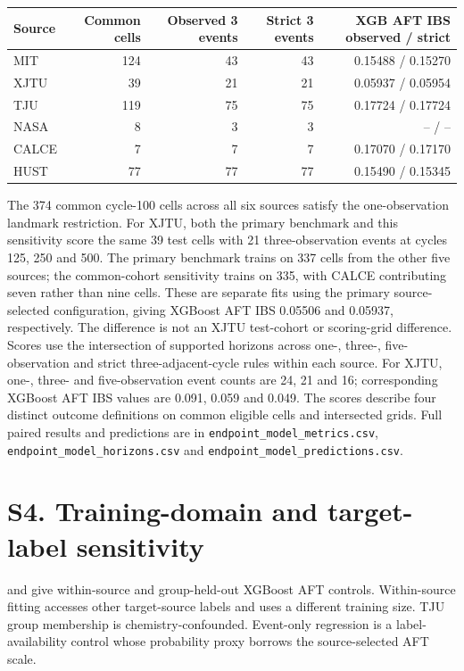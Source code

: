\documentclass[10pt,a4paper]{article}
\begin{document}
\begin{center}\small
\begin{minipage}{\linewidth}\centering
{}\label{tab:S4}
\begin{tabular}{lrrrr}
\toprule
Source & Common cells & Observed 3 events & Strict 3 events & XGB AFT IBS observed / strict \\\midrule
MIT &124&43&43&0.15488 / 0.15270\\
XJTU &39&21&21&0.05937 / 0.05954\\
TJU &119&75&75&0.17724 / 0.17724\\
NASA &8&3&3&-- / --\\
CALCE &7&7&7&0.17070 / 0.17170\\
HUST &77&77&77&0.15490 / 0.15345\\\bottomrule
\end{tabular}
\end{minipage}
\end{center}
The 374 common cycle-100 cells across all six sources satisfy the one-observation landmark restriction. For XJTU, both the primary benchmark and this sensitivity score the same 39 test cells with 21 three-observation events at cycles 125, 250 and 500. The primary benchmark trains on 337 cells from the other five sources; the common-cohort sensitivity trains on 335, with CALCE contributing seven rather than nine cells. These are separate fits using the primary source-selected configuration, giving XGBoost AFT IBS 0.05506 and 0.05937, respectively. The difference is not an XJTU test-cohort or scoring-grid difference. Scores use the intersection of supported horizons across one-, three-, five-observation and strict three-adjacent-cycle rules within each source. For XJTU, one-, three- and five-observation event counts are 24, 21 and 16; corresponding XGBoost AFT IBS values are 0.091, 0.059 and 0.049. The scores describe four distinct outcome definitions on common eligible cells and intersected grids. Full paired results and predictions are in \texttt{endpoint\_model\_metrics.csv}, \texttt{endpoint\_model\_horizons.csv} and \texttt{endpoint\_model\_predictions.csv}.

\section*{S4. Training-domain and target-label sensitivity}
 and  give within-source and group-held-out XGBoost AFT controls. Within-source fitting accesses other target-source labels and uses a different training size. TJU group membership is chemistry-confounded. Event-only regression is a label-availability control whose probability proxy borrows the source-selected AFT scale.
\end{document}
